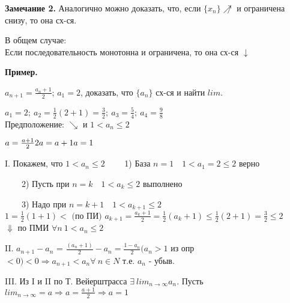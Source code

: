 \documentclass{article}
\begin{document}
    \textbf{Замечание 2.}
    Аналогично можно доказать, что, если \(\{x_n\} \not\nearrow\) и ограничена снизу, то она сх-ся.
    
    В общем случае:
    \\ Если последовательность монотонна и ограничена, то она сх-ся \(\downarrow\)
    
    \textbf{Пример.}

    \(a_{n+1} = \frac{a_n + 1}{2}\); \(a_1 = 2\), доказать, что \(\{a_n\}\) сх-ся и найти \(lim\).

    \(a_1 = 2;\ a_2 = \frac{1}{2}(2+1) = \frac{3}{2};\ a_3 = \frac{5}{4};\ a_4 = \frac{9}{8}\)
    \\ Предположение: \(\searrow\) и \(1 < a_n \leq 2\)

    \(a = \frac{a+1}{2} \\ 2a = a + 1 \\ a = 1\)

    I. Покажем, что \(1 < a_n \leq 2\)
    \ \ \ \ 1) База \(n = 1 \quad 1 < a_1 = 2 \leq 2\) верно

    \ \ \ \ 2) Пусть при \(n = k \quad 1 < a_k \leq 2\) выполнено

    \ \ \ \ 3) Надо при \(n = k + 1 \quad 1 < a_{k+1} \leq 2\)
    \\ \(1 = \frac{1}{2}(1+1) < \textrm{ (по ПИ) } a_{k+1} = \frac{a_k + 1}{2} = \frac{1}{2}(a_k + 1) \leq \frac{1}{2}(2 + 1) = \frac{3}{2} \leq 2\)
    \\ \(\Downarrow\) по ПМИ \(\forall n \ 1 < a_n \leq 2\)

    II. \( a_{n+1} - a_n \) = \( \frac{(a_n+1)}{2} - a_n = \frac{1-a_n}{2} (a_n > 1\) из опр \(<0) < 0 \Rightarrow a_{n+1} < a_n \forall\ n \in N \) т.е. \( a_n \) - убыв.

    III. Из I и II по Т. Вейерштрасса \( \exists\ lim_{n \rightarrow \infty}a_n \). Пусть \(lim_{n \rightarrow \infty } = a \Rightarrow a = \frac{a + 1}{2} \Rightarrow a = 1 \)
\end{document}
